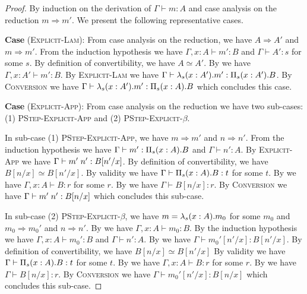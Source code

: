 \begin{proof}
  By induction on the derivation of $\Gamma \vdash m : A$ and case analysis on the reduction $m \Rightarrow m'$.
  We present the following representative cases.

\textbf{Case} (\textsc{Explicit-Lam}):
  From case analysis on the reduction, we have $A \Rightarrow A'$ and $m \Rightarrow m'$.
  From the induction hypothesis we have $\Gamma, x : A \vdash m' : B$ and $\Gamma \vdash A' : s$ for some $s$.
  By definition of convertibility, we have $A \simeq A'$.
  By  we have $\Gamma, x : A' \vdash m' : B$.
  By \textsc{Explicit-Lam} we have $\Gamma \vdash \lambda_{s}({x : A'}).{m'} : \Pi_{s}({x : A'}).{B}$.
  By \textsc{Conversion} we have $\Gamma \vdash \lambda_{s}({x : A'}).{m'} : \Pi_{s}({x : A}).{B}$ which concludes this case.

\textbf{Case} (\textsc{Explicit-App}):
  From case analysis on the reduction we have two sub-cases:
  (1) \textsc{PStep-Explicit-App} and (2) \textsc{PStep-Explicit-$\beta$}.

  In sub-case (1) \textsc{PStep-Explicit-App}, we have $m \Rightarrow m'$ and $n \Rightarrow n'$.
  From the induction hypothesis we have $\Gamma \vdash m' : \Pi_{s}({x : A}).{B}$ and $\Gamma \vdash n' : A$.
  By \textsc{Explicit-App} we have $\Gamma \vdash {m'}\;{n'} : B[n'/x]$.
  By definition of convertibility, we have $B[n/x] \simeq B[n'/x]$.
  By validity we have $\Gamma \vdash \Pi_{s}({x : A}).{B} : t$ for some $t$.
  By  we have $\Gamma, x : A \vdash B : r$ for some $r$.
  By  we have $\Gamma \vdash B[n/x] : r$.
  By \textsc{Conversion} we have $\Gamma \vdash {m'}\;{n'} : B[n/x]$ which concludes this sub-case.

  In sub-case (2) \textsc{PStep-Explicit-$\beta$}, we have $m = \lambda_{s}({x : A}).{m_0}$ for some $m_0$
  and $m_0 \Rightarrow m_0'$ and $n \Rightarrow n'$.
  By  we have $\Gamma, x : A \vdash m_0 : B$.
  By the induction hypothesis we have $\Gamma, x : A \vdash m_0' : B$ and $\Gamma \vdash n' : A$.
  By  we have $\Gamma \vdash m_0'[n'/x] : B[n'/x]$.
  By definition of convertibility, we have $B[n/x] \simeq B[n'/x]$
  By validity we have $\Gamma \vdash \Pi_{s}({x : A}).{B} : t$ for some $t$.
  By  we have $\Gamma, x : A \vdash B : r$ for some $r$.
  By  we have $\Gamma \vdash B[n/x] : r$.
  By \textsc{Conversion} we have $\Gamma \vdash m_0'[n'/x] : B[n/x]$ which concludes this sub-case.


\end{proof}

